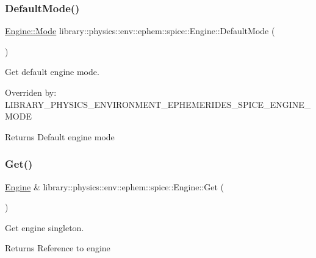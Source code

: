 \subsubsection{\texorpdfstring{Default\+Mode()}{DefaultMode()}}
{\footnotesize\ttfamily \hyperlink{classlibrary_1_1physics_1_1env_1_1ephem_1_1spice_1_1_engine_a2d185a63bce354bff9ad38810410eab4}{Engine\+::\+Mode} library\+::physics\+::env\+::ephem\+::spice\+::\+Engine\+::\+Default\+Mode (\begin{DoxyParamCaption}{ }\end{DoxyParamCaption})\hspace{0.3cm}{\ttfamily [static]}}



Get default engine mode. 

Overriden by\+: L\+I\+B\+R\+A\+R\+Y\+\_\+\+P\+H\+Y\+S\+I\+C\+S\+\_\+\+E\+N\+V\+I\+R\+O\+N\+M\+E\+N\+T\+\_\+\+E\+P\+H\+E\+M\+E\+R\+I\+D\+E\+S\+\_\+\+S\+P\+I\+C\+E\+\_\+\+E\+N\+G\+I\+N\+E\+\_\+\+M\+O\+DE

\begin{DoxyReturn}{Returns}
Default engine mode 
\end{DoxyReturn}
\mbox{\label{classlibrary_1_1physics_1_1env_1_1ephem_1_1spice_1_1_engine_a9d5058448b12c353edcf5a420cec2745}} 
\subsubsection{\texorpdfstring{Get()}{Get()}}
{\footnotesize\ttfamily \hyperlink{classlibrary_1_1physics_1_1env_1_1ephem_1_1spice_1_1_engine}{Engine} \& library\+::physics\+::env\+::ephem\+::spice\+::\+Engine\+::\+Get (\begin{DoxyParamCaption}{ }\end{DoxyParamCaption})\hspace{0.3cm}{\ttfamily [static]}}



Get engine singleton. 

\begin{DoxyReturn}{Returns}
Reference to engine 
\end{DoxyReturn}
\mbox{\label{classlibrary_1_1physics_1_1env_1_1ephem_1_1spice_1_1_engine_af5bdad7a3783f772b726ac3f0cd09957}} 
